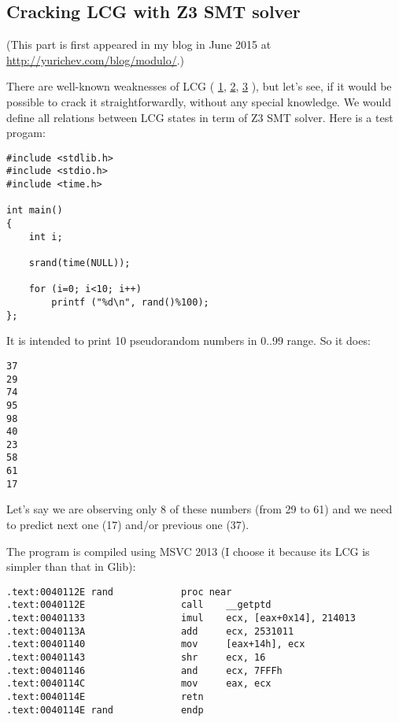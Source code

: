 \subsection{Cracking \ac{LCG} with Z3 \ac{SMT} solver}

(This part is first appeared in my blog in June 2015 at \url{http://yurichev.com/blog/modulo/}.)

There are well-known weaknesses of LCG (
\href{http://en.wikipedia.org/wiki/Linear_congruential_generator#Advantages_and_disadvantages_of_LCGs}{1},
\href{http://www.reteam.org/papers/e59.pdf}{2},
\href{http://stackoverflow.com/questions/8569113/why-1103515245-is-used-in-rand/8574774#8574774}{3}
), but let's see, if it would be possible to crack it straightforwardly, without any special knowledge.
We would define all relations between LCG states in term of Z3 \ac{SMT} solver.
Here is a test progam:

\begin{lstlisting}
#include <stdlib.h>
#include <stdio.h>
#include <time.h>

int main()
{
	int i;

	srand(time(NULL));

	for (i=0; i<10; i++)
		printf ("%d\n", rand()%100);
};
\end{lstlisting}

It is intended to print 10 pseudorandom numbers in 0..99 range.
So it does:

\begin{lstlisting}
37
29
74
95
98
40
23
58
61
17
\end{lstlisting}

Let's say we are observing only 8 of these numbers (from 29 to 61) and we need to predict next one (17) and/or previous one (37).

The program is compiled using MSVC 2013 (I choose it because its LCG is simpler than that in Glib):

\begin{lstlisting}
.text:0040112E rand            proc near
.text:0040112E                 call    __getptd
.text:00401133                 imul    ecx, [eax+0x14], 214013
.text:0040113A                 add     ecx, 2531011
.text:00401140                 mov     [eax+14h], ecx
.text:00401143                 shr     ecx, 16
.text:00401146                 and     ecx, 7FFFh
.text:0040114C                 mov     eax, ecx
.text:0040114E                 retn
.text:0040114E rand            endp
\end{lstlisting}


